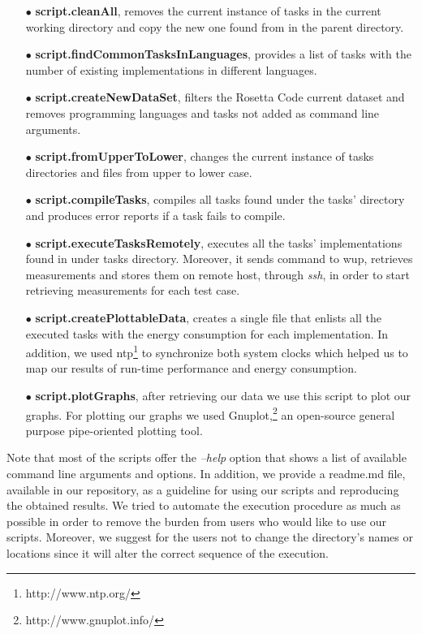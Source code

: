 \begin{enumerate}
	\item [$\bullet$] \textbf{script.cleanAll}, removes the current instance 
	of tasks in the current working directory and copy the new one found 
	from in the parent directory. 
	\item [$\bullet$] \textbf{script.findCommonTasksInLanguages}, provides 
	a list of tasks with the number of existing implementations in different languages.
	\item [$\bullet$] \textbf{script.createNewDataSet}, filters the Rosetta 
	Code current dataset and removes programming languages and tasks not 
	added as command line arguments.
	\item [$\bullet$] \textbf{script.fromUpperToLower}, changes the current 
	instance of tasks directories and files from upper to lower 
	case. 
	\item [$\bullet$] \textbf{script.compileTasks}, compiles all tasks found 
	under the tasks' directory and produces error reports if a task fails to 
	compile.
	\item [$\bullet$] \textbf{script.executeTasksRemotely}, executes all the tasks' 
	implementations found in under tasks directory. 
	Moreover, it sends command to {\sc wup}, retrieves measurements and stores 
	them on remote host, through \textit{ssh}, in order to start retrieving 
	measurements for each test case. 
	\item [$\bullet$] \textbf{script.createPlottableData}, creates a single file 
	that enlists all the executed tasks with the energy consumption for each 
	implementation. In addition, we used {\sc ntp}\footnote{http://www.ntp.org/} to 
	synchronize both system clocks which helped us to map our results of 
	run-time performance and energy consumption. 
	\item [$\bullet$] \textbf{script.plotGraphs}, after retrieving our data 
	we use this script to plot our graphs. 
	For plotting our graphs we used Gnuplot,\footnote{http://www.gnuplot.info/} 
	an open-source general purpose pipe-oriented plotting tool.
\end{enumerate}

Note that most of the scripts offer the \textit{--help} option 
that shows a list of available command line arguments and options.
In addition, we provide a {\sc readme.md} file, available in our 
repository, as a guideline for using our scripts and reproducing 
the obtained results. 
We tried to automate the execution procedure as much as possible 
in order to remove the burden from users who would like to use 
our scripts.
Moreover, we suggest for the users not to change the directory's names or 
locations since it will alter the correct sequence of the 
execution. 

